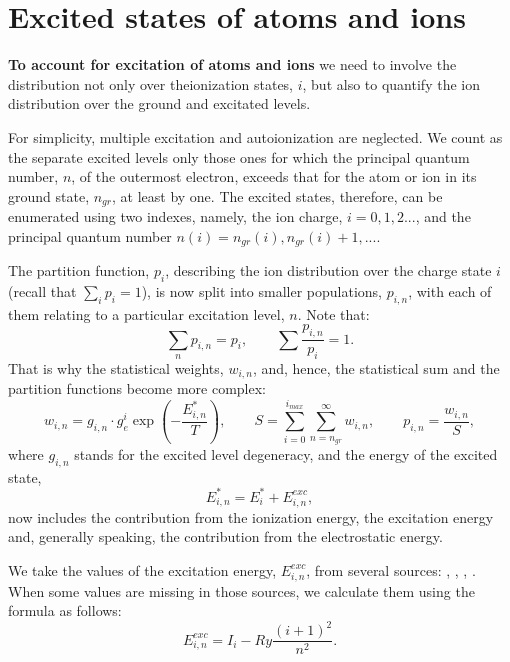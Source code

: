 \section{Excited states of atoms and ions}
{\bf To account for excitation of atoms and ions} we need to involve the
distribution not only over theionization states, $i$, but also to quantify the
ion distribution over the ground and 
excitated levels. 

For simplicity,  multiple excitation and autoionization are neglected. We
count as the separate excited levels only those ones for which the principal 
quantum number, 
$n$, of the outermost electron, exceeds that for the atom or ion in its ground state, 
$n_{gr}$, at least by one. The excited states, therefore, can be enumerated using two indexes,
namely, the ion charge, $i=0,1,2...$, and the principal quantum number 
$n(i)=n_{gr}(i),n_{gr}(i)+1,...$. 

The partition function, $p_i$, describing the ion distribution over the charge state $i$ 
(recall that $\sum_i{p_i}=1$), 
is now split into smaller populations, $p_{i,n}$, with each of them relating to a particular 
excitation level, $n$. Note that:
\begin{equation}
\sum_n{p_{i,n}}=p_i,\qquad \sum{\frac{p_{i,n}}{p_i}}=1.	
\end{equation}
That is why the statistical weights, $w_{i,n}$, and, hence, the statistical sum and the partition functions
become more complex:
\begin{equation}
w_{i,n} = g_{i,n} \cdot g_e^i \exp \left( -\frac{E^*_{i,n}}{T} \right),\qquad
S = \sum_{i=0}^{i_{max}} \sum_{n=n_{gr}}^{\infty} w_{i,n},\qquad
p_{i,n} = \frac{w_{i,n}}{S},
\end{equation}
where $g_{i,n}$ stands for the excited level degeneracy, and the energy of the excited state,
\begin{equation}
E^*_{i,n}=E^*_i + E^{exc}_{i,n},
\end{equation} 
now includes the contribution from the ionization energy, the excitation energy and, generally 
speaking, the contribution from the electrostatic energy.

We take the values of the excitation energy, $E^{exc}_{i,n}$, from several sources:
\cite{spectrw3}, \cite{nistdb}, \cite{RefAlMartin}, \cite{RefXeSaloman}.
When some values are missing in those sources, we calculate them using the formula as follows:
\begin{equation}\label{estarin}
E^{exc}_{i,n} = I_i - Ry \frac{(i+1)^2}{n^2}.
\end{equation}

